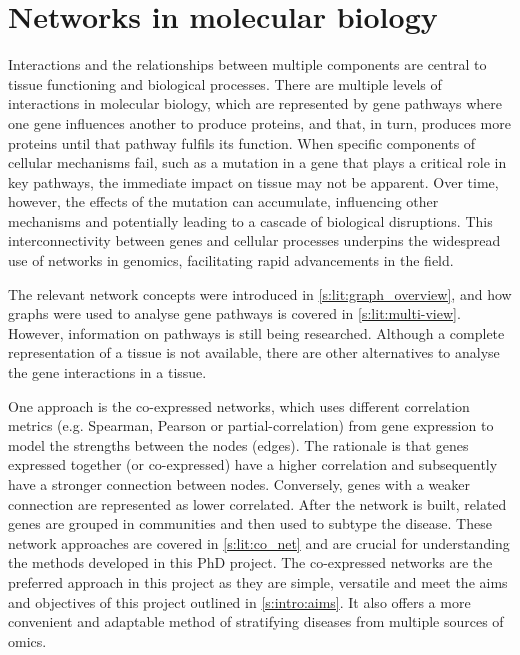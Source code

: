 \section{Networks in molecular biology} \label{s:lit:nets_bio}

\vspace{3mm}
\vspace{3mm}

Interactions and the relationships between multiple components are central to tissue functioning and biological processes. There are multiple levels of interactions in molecular biology, which are represented by gene pathways where one gene influences another to produce proteins, and that, in turn, produces more proteins until that pathway fulfils its function. When specific components of cellular mechanisms fail, such as a mutation in a gene that plays a critical role in key pathways, the immediate impact on tissue may not be apparent. Over time, however, the effects of the mutation can accumulate, influencing other mechanisms and potentially leading to a cascade of biological disruptions. This interconnectivity between genes and cellular processes underpins the widespread use of networks in genomics, facilitating rapid advancements in the field.

The relevant network concepts were introduced in \cref{s:lit:graph_overview}, and how graphs were used to analyse gene pathways is covered in \cref{s:lit:multi-view}. However, information on pathways is still being researched. Although a complete representation of a tissue is not available, there are other alternatives to analyse the gene interactions in a tissue.

One approach is the co-expressed networks, which uses different correlation metrics (e.g. Spearman, Pearson or partial-correlation) from gene expression to model the strengths between the nodes (edges). The rationale is that genes expressed together (or co-expressed) have a higher correlation and subsequently have a stronger connection between nodes. Conversely, genes with a weaker connection are represented as lower correlated. After the network is built, related genes are grouped in communities and then used to subtype the disease. These network approaches are covered in \cref{s:lit:co_net} and are crucial for understanding the methods developed in this PhD project. The co-expressed networks are the preferred approach in this project as they are simple, versatile and meet the aims and objectives of this project outlined in \cref{s:intro:aims}. It also offers a more convenient and adaptable method of stratifying diseases from multiple sources of omics.


